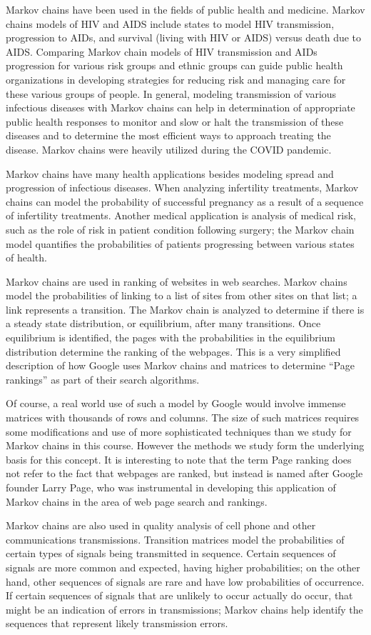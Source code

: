 Markov chains have been used in the fields of public health and medicine.  Markov chains models of HIV and AIDS include states to model HIV transmission, progression to AIDs, and survival (living with HIV or AIDS) versus death due to AIDS. Comparing Markov chain models of HIV transmission and AIDs progression for various risk groups and ethnic groups can guide public health organizations in developing strategies for reducing risk and managing care for these various groups of people. In general, modeling transmission of various infectious diseases with Markov chains can help in determination of appropriate public health responses to monitor and slow or halt the transmission of these diseases and to determine the most efficient ways to approach treating the disease. Markov chains were heavily utilized during the COVID pandemic.

Markov chains have many health applications besides modeling spread and progression of infectious diseases. When analyzing infertility treatments, Markov chains can model the probability of successful pregnancy as a result of a sequence of infertility treatments.  Another medical application is analysis of medical risk, such as the role of risk in patient condition following surgery; the Markov chain model quantifies the probabilities of patients progressing between various states of health.

Markov chains are used in ranking of websites in web searches.  Markov chains model the probabilities of linking to a list of sites from other sites on that list; a link represents a transition.  The Markov chain is analyzed to determine if there is a steady state distribution, or equilibrium, after many transitions.  Once equilibrium is identified, the pages with the probabilities in the equilibrium distribution determine the ranking of the webpages.  This is a very simplified description of how Google uses Markov chains and matrices to determine “Page rankings” as part of their search algorithms.

Of course, a real world use of such a model by Google would involve immense matrices with thousands of rows and columns.  The size of such matrices requires some modifications and use of more sophisticated techniques than we study for Markov chains in this course.  However the methods we study form the underlying basis for this concept.  It is interesting to note that the term Page ranking does not refer to the fact that webpages are ranked, but instead is named after Google founder Larry Page, who was instrumental in developing this application of Markov chains in the area of web page search and rankings.

Markov chains are also used in quality analysis of cell phone and other communications transmissions.  Transition matrices model the probabilities of certain types of signals being transmitted in sequence.  Certain sequences of signals are more common and expected, having higher probabilities; on the other hand, other sequences of signals are rare and have low probabilities of occurrence. If certain sequences of signals that are unlikely to occur actually do occur, that might be an indication of errors in transmissions; Markov chains help identify the sequences that represent likely transmission errors.
